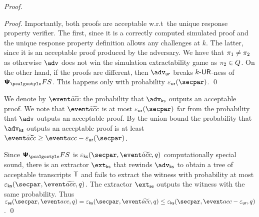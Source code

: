 \begin{proof}
\begin{proof}
	Importantly, both proofs are acceptable w.r.t~the unique response property verifier. The first, since it is a correctly computed simulated proof and the unique response property definition allows any challenges at $k$. The latter, since it is an acceptable proof produced by the adversary.
	We have that $\pi_1 \neq \pi_2$ as otherwise $\advse$ does not win the simulation extractability game as $\pi_2 \in Q$. On the other hand, if the proofs are different, then $\advur$ breaks ${k\text{-}\mathsf{UR}}$-ness of $\psfs$. This happens only with  probability $\epsur(\secpar)$. 
	\qed
	\end{proof}

	We denote by $\waccProb$ the probability that $\advcss$ outputs an acceptable proof. We note that $\waccProb$ is at most $\epsur (\secpar)$ far from the probability that $\advse$ outputs an acceptable proof. By the union bound the probability that $\advcss$ outputs an acceptable proof is at least $\waccProb \geq \accProb - \epsur (\secpar)$. 

	Since $\psfs$ is $\epscss (\secpar, \waccProb,q)$ computationally special sound, there is an extractor $\extcss$ that rewinds $\advcss$ to obtain a tree of acceptable transcripts $\mathsf{T}$ and fails to extract the witness with probability at most $\epscss (\secpar, \waccProb, q)$. The extractor $\extse$ outputs the witness with the same probability.
%
	Thus $\epsse(\secpar,\accProb,q) = \epscss (\secpar, \waccProb,q) \leq \epscss(\secpar,\accProb - \epsur,q)$.
	\qed
	\end{proof}


